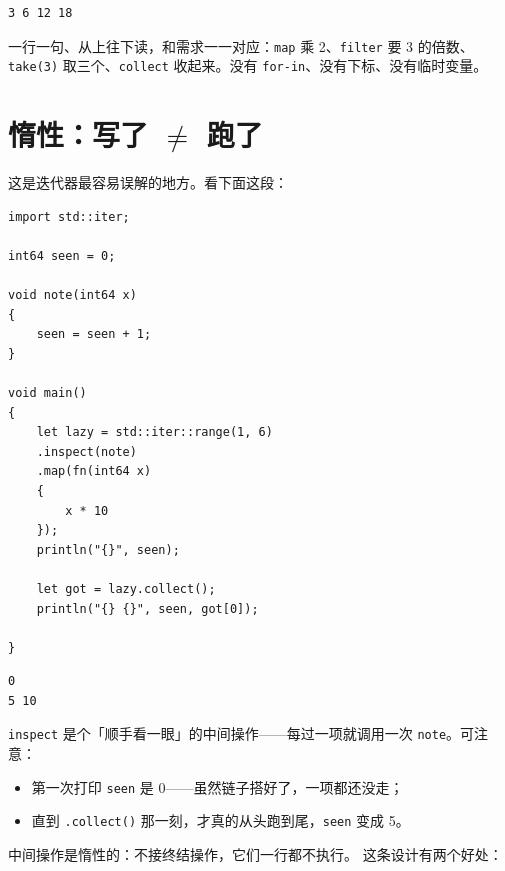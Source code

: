 \par
\medskip
\begin{lstlisting}[style=out]
3 6 12 18
\end{lstlisting}
\par
\medskip

一行一句、从上往下读，和需求一一对应：\texttt{map} 乘 2、\texttt{filter} 要 3 的倍数、\texttt{take(\allowbreak{}3)\allowbreak{}} 取三个、\texttt{collect} 收起来。没有 \texttt{for-in}、没有下标、没有临时变量。

\section{惰性：写了 \ensuremath{\neq} 跑了}

这是迭代器最容易误解的地方。看下面这段：

\par
\medskip
\begin{lstlisting}[style=chali]
import std::iter;

int64 seen = 0;

void note(int64 x)
{
    seen = seen + 1;
}

void main()
{
    let lazy = std::iter::range(1, 6)
    .inspect(note)
    .map(fn(int64 x)
    {
        x * 10
    });
    println("{}", seen);

    let got = lazy.collect();
    println("{} {}", seen, got[0]);

}
\end{lstlisting}
\par
\medskip

\par
\medskip
\begin{lstlisting}[style=out]
0
5 10
\end{lstlisting}
\par
\medskip

\texttt{inspect} 是个「顺手看一眼」的中间操作——每过一项就调用一次 \texttt{note}。可注意：

\begin{itemize}

\item 第一次打印 \texttt{seen} 是 0——虽然链子搭好了，一项都还没走；

\item 直到 \texttt{.\allowbreak{}collect(\allowbreak{})\allowbreak{}} 那一刻，才真的从头跑到尾，\texttt{seen} 变成 5。

\end{itemize}

中间操作是惰性的：不接终结操作，它们一行都不执行。 这条设计有两个好处：

